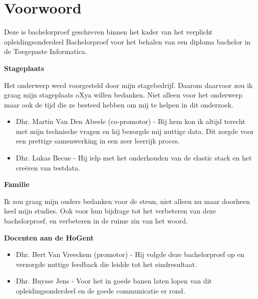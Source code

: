 
\chapter*{Voorwoord}
\label{ch:voorwoord}
Deze is bachelorproef geschreven binnen het kader van het verplicht opleidingsonderdeel Bachelorproef voor het behalen van een diploma bachelor in de Toegepaste Informatica.

\textbf{Stageplaats}

Het onderwerp werd voorgesteld door mijn stagebedrijf. Daarom daarvoor zou ik graag mijn stageplaats oXya willen bedanken. Niet alleen voor het onderwerp maar ook de tijd die ze besteed hebben om mij te helpen in dit onderzoek. 
\begin{itemize}
	\item Dhr. Martin Van Den Abeele (co-promotor) - Bij hem kon ik altijd terecht met mijn technische vragen en hij bezorgde mij nuttige data. Dit zorgde voor een prettige samenwerking in een zeer leerrijk proces.
   
   
   \item Dhr. Lukas Becue - Hij ielp met het onderhouden van de elastic stack en het creëren van testdata.
\end{itemize}

\textbf{Familie}

Ik zou graag mijn ouders bedanken voor de steun, niet alleen nu maar doorheen heel mijn studies.
Ook voor hun bijdrage tot het verbeteren van deze bachelorproef, en verbeteren in de ruime zin van het woord.

\textbf{Docenten aan de HoGent}
	\begin{itemize}
	\item Dhr. Bert Van Vreeckem (promotor) - Hij volgde deze bachelorproef op en verzorgde nuttige feedback die leidde tot het eindresultaat.
   
   
   \item Dhr. Buysse Jens - Voor het in goede banen laten lopen van dit opleidingsonderdeel en de goede communicatie er rond.
\end{itemize}

